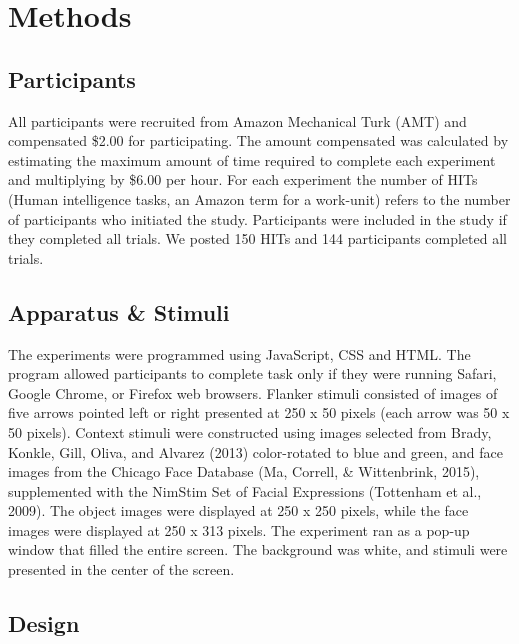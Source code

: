 \documentclass[english,,man,floatsintext]{apa6}
\begin{document}
\hypertarget{methods}{%
\section{Methods}\label{methods}}

\hypertarget{participants}{%
\subsection{Participants}\label{participants}}

All participants were recruited from Amazon Mechanical Turk (AMT) and compensated \$2.00 for participating. The amount compensated was calculated by estimating the maximum amount of time required to complete each experiment and multiplying by \$6.00 per hour. For each experiment the number of HITs (Human intelligence tasks, an Amazon term for a work-unit) refers to the number of participants who initiated the study. Participants were included in the study if they completed all trials. We posted 150 HITs and 144 participants completed all trials.

\hypertarget{apparatus-stimuli}{%
\subsection{Apparatus \& Stimuli}\label{apparatus-stimuli}}

The experiments were programmed using JavaScript, CSS and HTML. The program allowed participants to complete task only if they were running Safari, Google Chrome, or Firefox web browsers. Flanker stimuli consisted of images of five arrows pointed left or right presented at 250 x 50 pixels (each arrow was 50 x 50 pixels). Context stimuli were constructed using images selected from Brady, Konkle, Gill, Oliva, and Alvarez (2013) color-rotated to blue and green, and face images from the Chicago Face Database (Ma, Correll, \& Wittenbrink, 2015), supplemented with the NimStim Set of Facial Expressions (Tottenham et al., 2009). The object images were displayed at 250 x 250 pixels, while the face images were displayed at 250 x 313 pixels. The experiment ran as a pop-up window that filled the entire screen. The background was white, and stimuli were presented in the center of the screen.

\hypertarget{design}{%
\subsection{Design}\label{design}}
\end{document}
